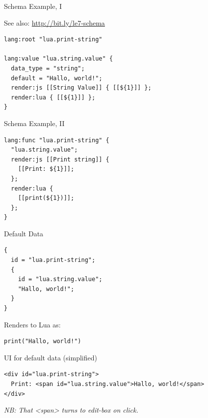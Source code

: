 \documentclass[handout]{beamer}
\begin{document}

\begin{frame}[fragile]{Schema Example, I}

See also: \url{http://bit.ly/le7-schema}

\begin{verbatim}
lang:root "lua.print-string"

lang:value "lua.string.value" {
  data_type = "string";
  default = "Hallo, world!";
  render:js [[String Value]] { [[${1}]] };
  render:lua { [[${1}]] };
}
\end{verbatim}

\end{frame}


\begin{frame}[fragile]{Schema Example, II}

\begin{verbatim}
lang:func "lua.print-string" {
  "lua.string.value";
  render:js [[Print string]] {
    [[Print: ${1}]];
  };
  render:lua {
    [[print(${1})]];
  };
}

\end{verbatim}

\end{frame}


\begin{frame}[fragile]{Default Data}

\begin{verbatim}
{
  id = "lua.print-string";
  {
    id = "lua.string.value";
    "Hallo, world!";
  }
}
\end{verbatim}

Renders to Lua as:

\begin{verbatim}
print("Hallo, world!")
\end{verbatim}

\end{frame}


\begin{frame}[fragile]{UI for default data (simplified)}

\begin{verbatim}
<div id="lua.print-string">
  Print: <span id="lua.string.value">Hallo, world!</span>
</div>
\end{verbatim}

\textit{NB: That <span> turns to edit-box on click.}

\end{frame}
\end{document}
